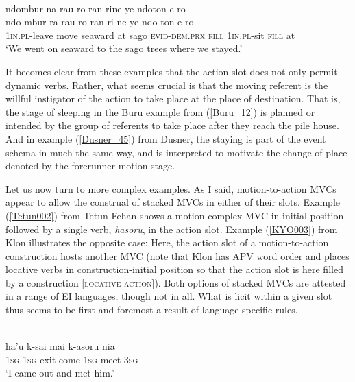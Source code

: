 \ea \label{Dusner_45}
\\
\glll ndombur na rau ro ran rine ye ndoton e ro \\
ndo-mbur ra rau ro ran ri-ne ye ndo-ton e ro \\
1\textsc{in}.\textsc{pl}-leave move seaward at sago \textsc{evid}-\textsc{dem}.\textsc{prx} \textsc{fill} 1\textsc{in}.\textsc{pl}-sit \textsc{fill} at \\
\glft `We went on seaward to the sago trees where we stayed.'\\ 
\z

It becomes clear from these examples that the action slot does not only permit dynamic verbs. Rather, what seems crucial is that the moving referent is the willful instigator of the action to take place at the place of destination. That is, the stage of sleeping in the Buru example from (\ref{Buru_12}) is planned or intended by the group of referents to take place after they reach the pile house. And in example (\ref{Dusner_45}) from Dusner, the staying is part of the event schema in much the same way, and is interpreted to motivate the change of place denoted by the forerunner motion stage.

Let us now turn to more complex examples. As I said, motion-to-action MVCs appear to allow the construal of stacked MVCs in either of their slots. Example (\ref{Tetun002}) from Tetun Fehan shows a motion complex MVC in initial position followed by a single verb, \textit{hasoru}, in the action slot. Example (\ref{KYO003}) from Klon illustrates the opposite case: Here, the action slot of a motion-to-action construction hosts another MVC (note that Klon has APV word order and places locative verbs in construction-initial position so that the action slot is here filled by a construction [\textsc{locative} \textsc{action}]). Both options of stacked MVCs are attested in a range of EI languages, though not in all. What is licit within a given slot thus seems to be first and foremost a result of language-specific rules.

\ea \label{Tetun002}
\\
\gll ha'u k-sai mai k-asoru nia \\
\textsc{1}\textsc{sg} \textsc{1}\textsc{sg}-exit come \textsc{1}\textsc{sg}-meet \textsc{3}\textsc{sg} \\
\glft `I came out and met him.'\\ 
\z

